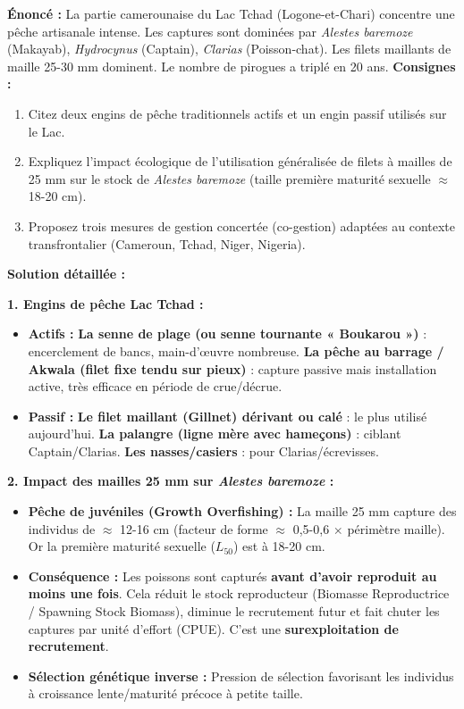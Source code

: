 \documentclass[11pt]{article}
\begin{document}
\begin{exoresolu}
\textbf{Énoncé :} La partie camerounaise du Lac Tchad (Logone-et-Chari) concentre une pêche artisanale intense. Les captures sont dominées par \textit{Alestes baremoze} (Makayab), \textit{Hydrocynus} (Captain), \textit{Clarias} (Poisson-chat). Les filets maillants de maille 25-30 mm dominent. Le nombre de pirogues a triplé en 20 ans.
\textbf{Consignes :}
\begin{enumerate}
    \item Citez deux engins de pêche traditionnels actifs et un engin passif utilisés sur le Lac.
    \item Expliquez l'impact écologique de l'utilisation généralisée de filets à mailles de 25 mm sur le stock de \textit{Alestes baremoze} (taille première maturité sexuelle $\approx$ 18-20 cm).
    \item Proposez trois mesures de gestion concertée (co-gestion) adaptées au contexte transfrontalier (Cameroun, Tchad, Niger, Nigeria).
\end{enumerate}
\tcblower
\textbf{Solution détaillée :}

\textbf{1. Engins de pêche Lac Tchad :}
\begin{itemize}
    \item \textbf{Actifs :} \textbf{La senne de plage (ou senne tournante « Boukarou »)} : encerclement de bancs, main-d'œuvre nombreuse. \textbf{La pêche au barrage / Akwala (filet fixe tendu sur pieux)} : capture passive mais installation active, très efficace en période de crue/décrue.
    \item \textbf{Passif :} \textbf{Le filet maillant (Gillnet) dérivant ou calé} : le plus utilisé aujourd'hui. \textbf{La palangre (ligne mère avec hameçons)} : ciblant Captain/Clarias. \textbf{Les nasses/casiers} : pour Clarias/écrevisses.
\end{itemize}

\textbf{2. Impact des mailles 25 mm sur \textit{Alestes baremoze} :}
\begin{itemize}
    \item \textbf{Pêche de juvéniles (Growth Overfishing) :} La maille 25 mm capture des individus de $\approx$ 12-16 cm (facteur de forme $\approx$ 0,5-0,6 $\times$ périmètre maille). Or la première maturité sexuelle ($L_{50}$) est à 18-20 cm.
    \item \textbf{Conséquence :} Les poissons sont capturés \textbf{avant d'avoir reproduit au moins une fois}. Cela réduit le stock reproducteur (Biomasse Reproductrice / Spawning Stock Biomass), diminue le recrutement futur et fait chuter les captures par unité d'effort (CPUE). C'est une \textbf{surexploitation de recrutement}.
    \item \textbf{Sélection génétique inverse :} Pression de sélection favorisant les individus à croissance lente/maturité précoce à petite taille.
\end{itemize}


\end{exoresolu}
\end{document}
